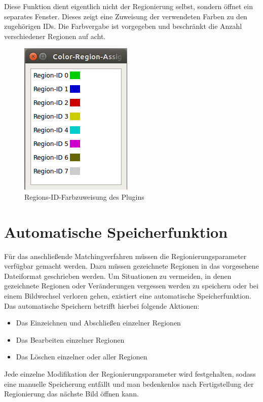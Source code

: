 \begin{itemize}
Diese Funktion dient eigentlich nicht der Regionierung selbst, sondern \"offnet ein separates Fenster. Dieses zeigt eine Zuweisung der verwendeten Farben zu den zugeh\"origen IDs. Die Farbvergabe ist vorgegeben und beschr\"ankt die Anzahl verschiedener Regionen auf acht.

\begin{figure}[h]
\centering
\includegraphics{gfx/cols.png}
\caption[Regions-ID-Farbzuweisung des Plugins]{Regions-ID-Farbzuweisung des Plugins}
\label{gr:zuweisung}
\end{figure}
\FloatBarrier

\end{itemize}

\section{Automatische Speicherfunktion}
F\"ur das anschlie\ss ende Matchingverfahren m\"ussen die Regionierungsparameter verf\"ugbar gemacht werden. Dazu m\"ussen gezeichnete Regionen in das vorgesehene Dateiformat geschrieben werden. Um Situationen zu vermeiden, in denen gezeichnete Regionen oder Ver\"anderungen vergessen werden zu speichern oder bei einem Bildwechsel verloren gehen, existiert eine automatische Speicherfunktion. Das automatische Speichern betrifft hierbei folgende Aktionen:\\
\begin{itemize}
\item Das Einzeichnen und Abschlie\ss en einzelner Regionen
\item Das Bearbeiten einzelner Regionen
\item Das L\"oschen einzelner oder aller Regionen
\end{itemize}
Jede einzelne Modifikation der Regionierungsparameter wird festgehalten, sodass eine manuelle Speicherung entf\"allt und man bedenkenlos nach Fertigstellung der Regionierung das n\"achste Bild \"offnen kann.